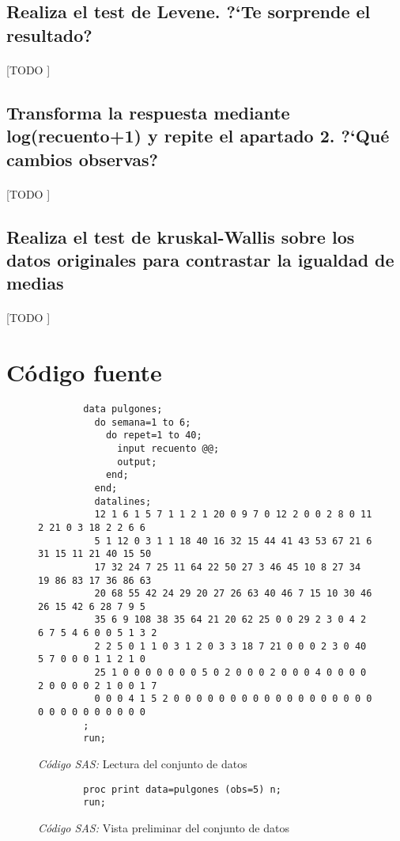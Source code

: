 \documentclass{article}
\begin{document}
    \subsection{Realiza el test de Levene. ?`Te sorprende el resultado?}

      \paragraph{}
      [TODO ]


    \subsection{Transforma la respuesta mediante log(recuento+1) y repite el apartado 2. ?`Qué cambios observas?}

      \paragraph{}
      [TODO ]


    \subsection{Realiza el test de kruskal-Wallis sobre los datos originales para contrastar la igualdad de medias}

      \paragraph{}
      [TODO ]

  \section{Código fuente}

    \begin{figure}
      \centering
      \begin{verbatim}
        data pulgones;
          do semana=1 to 6;
            do repet=1 to 40;
              input recuento @@;
              output;
            end;
          end;
          datalines;
          12 1 6 1 5 7 1 1 2 1 20 0 9 7 0 12 2 0 0 2 8 0 11 2 21 0 3 18 2 2 6 6
          5 1 12 0 3 1 1 18 40 16 32 15 44 41 43 53 67 21 6 31 15 11 21 40 15 50
          17 32 24 7 25 11 64 22 50 27 3 46 45 10 8 27 34 19 86 83 17 36 86 63
          20 68 55 42 24 29 20 27 26 63 40 46 7 15 10 30 46 26 15 42 6 28 7 9 5
          35 6 9 108 38 35 64 21 20 62 25 0 0 29 2 3 0 4 2 6 7 5 4 6 0 0 5 1 3 2
          2 2 5 0 1 1 0 3 1 2 0 3 3 18 7 21 0 0 0 2 3 0 40 5 7 0 0 0 1 1 2 1 0
          25 1 0 0 0 0 0 0 0 5 0 2 0 0 0 2 0 0 0 4 0 0 0 0 2 0 0 0 0 2 1 0 0 1 7
          0 0 0 4 1 5 2 0 0 0 0 0 0 0 0 0 0 0 0 0 0 0 0 0 0 0 0 0 0 0 0 0 0 0 0
        ;
        run;
      \end{verbatim}
      \caption{\emph{Código SAS:} Lectura del conjunto de datos}
      \label{code:sas_1}
    \end{figure}


    \begin{figure}
      \centering
      \begin{verbatim}
        proc print data=pulgones (obs=5) n;
        run;
      \end{verbatim}
      \caption{\emph{Código SAS:} Vista preliminar del conjunto de datos}
      \label{code:sas_1}
    \end{figure}
\end{document}
